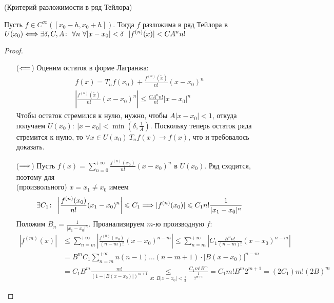\begin{theorem}(Критерий разложимости в ряд Тейлора)

    Пусть $f \in C^{\infty}([x_0 - h, x_0 + h])$. Тогда $f$ разложима в ряд
    Тейлора в $U(x_0) \Longleftrightarrow \exists \delta, C, A\colon~ \forall n~
    \forall |x - x_0| < \delta~~ |f^{(n)}(x)| < C A^n n!$
\end{theorem}
\begin{proof}
    \enewline
    \begin{itemize}
        \item[($\Longleftarrow$)] Оценим остаток в форме Лагранжа:
\begin{align*}
    f(x) = T_nf(x_0) + \frac{f^{(n)}(\tilde{x})}{n!}(x - x_0)^n \\
    \left|\frac{f^{(n)}(\tilde{x})}{n!}(x - x_0)^n\right| \leqslant
    \frac{CA^n n!}{n!}|x - x_0|^n
\end{align*}
    Чтобы остаток стремился к нулю, нужно, чтобы $A|x - x_0| < 1$, откуда
    получаем $U(x_0)\colon~ |x - x_0| < \min(\delta, \frac{1}{A})$. Поскольку
    теперь остаток ряда стремится к нулю, то $\forall x \in U(x_0)~
    T_nf(x) \to f(x)$, что и требовалось доказать.
        \item[($\Longrightarrow$)] Пусть $\displaystyle f(x) = \sum_{n = 0}^{+\infty}
        {\frac{f^{(n)}(x_0)}{n!}(x - x_0)^n}$ в $U(x_0)$. Ряд сходится, поэтому
        для \\ (произвольного) $x = x_1 \neq x_0$ имеем
\[
    \exists C_1\colon~ \left|\frac{f^{(n)}(x_0)}{n!}(x_1 - x_0)^n\right| \leqslant
    C_1 \Longrightarrow |f^{(n)}(x_0)| \leqslant C_1 n! \frac{1}{|x_1 - x_0|^n}
\]
        Положим $\displaystyle B_n = \frac{1}{|x_1 - x_0|^n}$. Проанализируем
        $m$-ю производную $f$:
\begin{align*}
    |f^{(m)}(x)| &\leqslant \sum_{n = m}^{+\infty}
    {\left|\frac{f^{(n)}(x_0)}{(n - m)!}(x - x_0)^{n - m}\right|}
    \leqslant \sum_{n = m}^{+\infty}{\left|C_1 \frac{B^n n!}{(n - m)!}(x - x_0)^{n
    - m}\right|} \\
    &= B^m C_1 \sum_{n = m}^{+\infty}{n(n - 1)\ldots(n - m + 1) \cdot |B(x -
    x_0)|^{n - m}} \\
    &= C_1 B^m \frac{m!}{(1 - |B(x - x_0)|)^{m + 1}}
    \underset{x\colon~ B|x - x_0| < \frac{1}{2}}{\leqslant} \frac{C_1 m!
    B^m}{\frac{1}{2^{m + 1}}} = C_1 m! B^m 2^{m + 1} = (2C_1)m! (2B)^m
\end{align*}
\end{itemize}
\end{proof}

